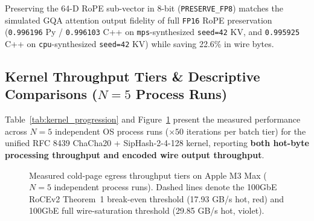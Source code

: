 \documentclass[10pt,twocolumn]{article}
\begin{document}
Preserving the 64-D RoPE sub-vector in 8-bit (\texttt{PRESERVE\_FP8}) matches the simulated GQA attention output fidelity of full \texttt{FP16} RoPE preservation (\texttt{0.996196} Py / \texttt{0.996103} C++ on \texttt{mps}-synthesized \texttt{seed=42} KV, and \texttt{0.995925} C++ on \texttt{cpu}-synthesized \texttt{seed=42} KV) while saving 22.6\% in wire bytes.

\subsection{Kernel Throughput Tiers \& Descriptive Comparisons ($N=5$ Process Runs)}
Table~\ref{tab:kernel_progression} and Figure~\ref{fig:throughput} present the measured performance across $N=5$ independent OS process runs ($\times 50$ iterations per batch tier) for the unified RFC 8439 ChaCha20 + SipHash-2-4-128 kernel, reporting \textbf{both hot-byte processing throughput and encoded wire output throughput}.

\begin{figure}[htbp]
\centering
{}
\caption{Measured cold-page egress throughput tiers on Apple M3 Max ($N=5$ independent process runs). Dashed lines denote the 100GbE RoCEv2 Theorem~1 break-even threshold (17.93 GB/s hot, red) and 100GbE full wire-saturation threshold (29.85 GB/s hot, violet).}
\label{fig:throughput}
\end{figure}
\end{document}
